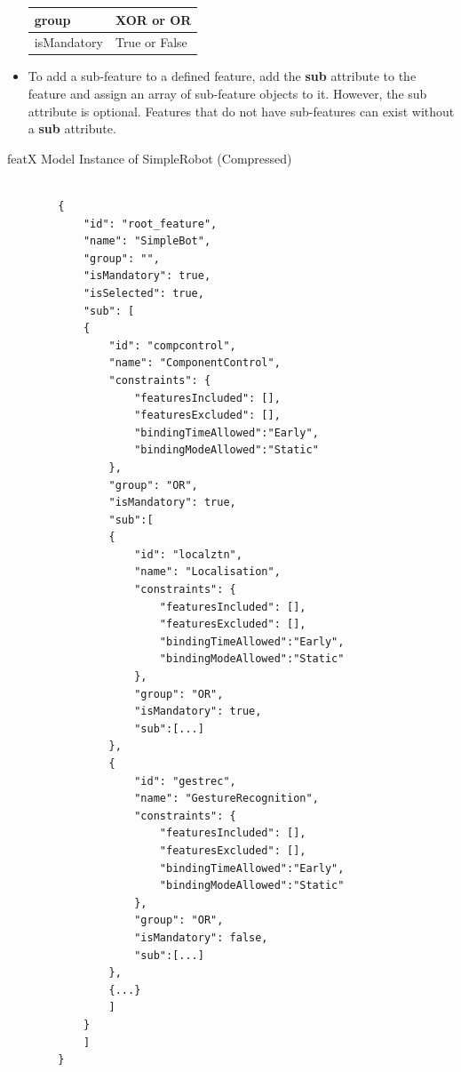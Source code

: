 \documentclass{article}
\newenvironment{longlisting}{\captionsetup{type=listing}}{}
\begin{document}
\begin{itemize}
\begin{table}[H]
\begin{tabular}{l|p{10cm}}
				group & XOR or OR \\ \hline
				isMandatory & True or False \\
				
			\end{tabular}
			\label{tab:valueTypes}
	\end{table}
	
	\item To add a sub-feature to a defined feature, add the \textbf{sub} attribute to the feature and assign an array of sub-feature objects to it. However, the sub attribute is optional. Features that do not have sub-features can exist without a \textbf{sub} attribute.
	
\end{itemize}

\begin{minipage}{.45\textwidth}
\begin{longlisting}
	\caption{featX Model Instance of SimpleRobot (Compressed)}
	\begin{verbatim}
		
		{
			"id": "root_feature",
			"name": "SimpleBot",
			"group": "",
			"isMandatory": true,
			"isSelected": true,
			"sub": [
			{
				"id": "compcontrol",
				"name": "ComponentControl",
				"constraints": {
					"featuresIncluded": [],
					"featuresExcluded": [],
					"bindingTimeAllowed":"Early",
					"bindingModeAllowed":"Static"
				},
				"group": "OR",
				"isMandatory": true,
				"sub":[
				{
					"id": "localztn",
					"name": "Localisation",
					"constraints": {
						"featuresIncluded": [],
						"featuresExcluded": [],
						"bindingTimeAllowed":"Early",
						"bindingModeAllowed":"Static"
					},
					"group": "OR",
					"isMandatory": true,
					"sub":[...]
				},
				{
					"id": "gestrec",
					"name": "GestureRecognition",
					"constraints": {
						"featuresIncluded": [],
						"featuresExcluded": [],
						"bindingTimeAllowed":"Early",
						"bindingModeAllowed":"Static"
					},
					"group": "OR",
					"isMandatory": false,
					"sub":[...]
				},
				{...}
				]
			}
			]
		}
		
	\end{verbatim}
	\label{feat-schema}
\end{longlisting}
\end{minipage}
\end{document}
